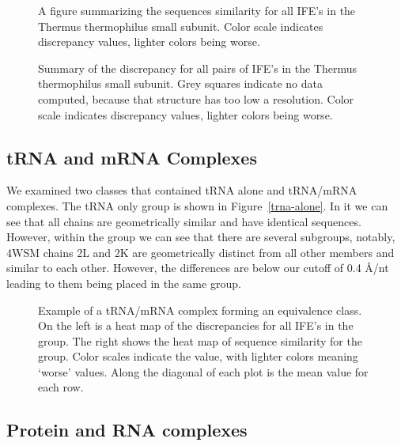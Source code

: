 \begin{figure}
  \caption{A figure summarizing the sequences similarity for all IFE’s in the
    Thermus thermophilus small subunit. Color scale indicates discrepancy
  values, lighter colors being worse.}
  \label{fig:tt-ssu-align}
\end{figure}

\begin{figure}
  \caption{Summary of the discrepancy for all pairs of IFE’s in the Thermus
    thermophilus small subunit. Grey squares indicate no data computed, because
    that structure has too low a resolution. Color scale indicates discrepancy
  values, lighter colors being worse.}
  \label{fig:tt-ssu-disc}
\end{figure}

\subsection{tRNA and mRNA Complexes}

We examined two classes that contained tRNA alone and tRNA/mRNA complexes. The
tRNA only group is shown in Figure~\ref{trna-alone}. In it we can see that all
chains are geometrically similar and have identical sequences. However, within
the group we can see that there are several subgroups, notably, 4WSM chains 2L
and 2K are geometrically distinct from all other members and similar to each
other. However, the differences are below our cutoff of 0.4 Å/nt leading to them
being placed in the same group. 

\begin{figure}
  \caption{Example of a tRNA/mRNA complex forming an equivalence class. On the
    left is a heat map of the discrepancies for all IFE’s in the group. The
    right shows the heat map of sequence similarity for the group. Color scales
    indicate the value, with lighter colors meaning ‘worse’ values. Along the
  diagonal of each plot is the mean value for each row.}
  \label{fig:trna-alone}
\end{figure}

\subsection{Protein and RNA complexes}

